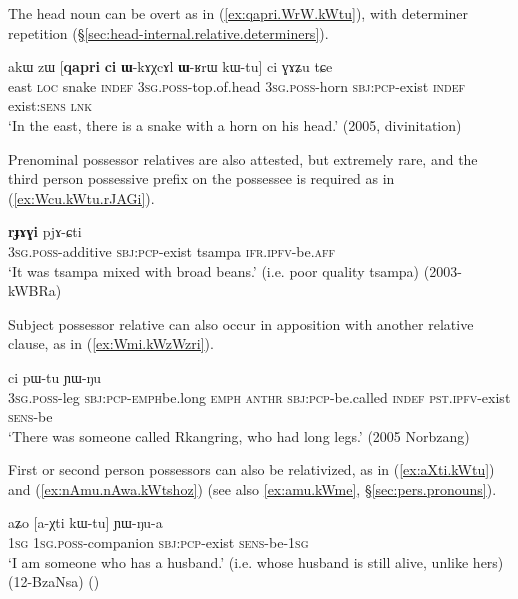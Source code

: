 The head noun can be overt  as in (\ref{ex:qapri.WrW.kWtu}), with determiner repetition (§\ref{sec:head-internal.relative.determiners}).


\begin{exe}
\ex \label{ex:qapri.WrW.kWtu}
\gll  akɯ zɯ [\textbf{qapri} \textbf{ci} \textbf{ɯ}-kɤχcɤl \textbf{ɯ}-ʁrɯ kɯ-tu] ci ɣɤʑu tɕe \\
east \textsc{loc} snake \textsc{indef} \textsc{3sg}.\textsc{poss}-top.of.head \textsc{3sg}.\textsc{poss}-horn \textsc{sbj}:\textsc{pcp}-exist \textsc{indef} exist:\textsc{sens} \textsc{lnk} \\
\glt `In the east, there is a snake with a horn on his head.' (2005, divinitation)
\end{exe}

 
Prenominal possessor relatives are also attested, but extremely rare, and the third person possessive prefix on the possessee is required as in (\ref{ex:Wcu.kWtu.rJAGi}).

\begin{exe}
\ex \label{ex:Wcu.kWtu.rJAGi}
\gll  [\textbf{ɯ}-cu kɯ-tu] \textbf{rɟɤɣi} pjɤ-ɕti \\
\textsc{3sg}.\textsc{poss}-additive \textsc{sbj}:\textsc{pcp}-exist tsampa \textsc{ifr}.\textsc{ipfv}-be.\textsc{aff} \\
\glt `It was tsampa mixed with broad beans.' (i.e. poor quality tsampa) (2003-kWBRa)
 \end{exe}

Subject possessor relative can also occur in apposition with another relative clause, as in (\ref{ex:Wmi.kWzWzri}).

\begin{exe}
 \ex \label{ex:Wmi.kWzWzri}
  ci pɯ-tu ɲɯ-ŋu \\
 \textsc{3sg}.\textsc{poss}-leg \textsc{sbj}:\textsc{pcp}-\textsc{emph}\redp{}be.long \textsc{emph}  \textsc{anthr} \textsc{sbj}:\textsc{pcp}-be.called \textsc{indef} \textsc{pst}.\textsc{ipfv}-exist \textsc{sens}-be \\
 \glt `There was someone called Rkangring, who had long legs.' (2005 Norbzang)
 \end{exe}

First or second person possessors can also be relativized, as in (\ref{ex:aXti.kWtu}) and (\ref{ex:nAmu.nAwa.kWtshoz}) (see also \ref{ex:amu.kWme}, §\ref{sec:pers.pronouns}).

\begin{exe}
\ex \label{ex:aXti.kWtu}
\gll aʑo [a-χti kɯ-tu] ɲɯ-ŋu-a \\
\textsc{1sg} \textsc{1sg}.\textsc{poss}-companion \textsc{sbj}:\textsc{pcp}-exist \textsc{sens}-be-\textsc{1sg} \\
\glt `I am someone who has a husband.' (i.e. whose husband is still alive, unlike hers) (12-BzaNsa)
()
\end{exe}

